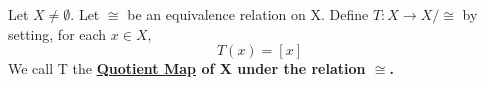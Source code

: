 \label{df:quotient_map}
\newcommand{\QuotientMap}[0]{
        \bf \hyperref[df:quotient_map]{Quotient Map} \rm
    }
    
 \newcommand{\QuotientMapInstance}[3]{
     #1 : #2\to #2/#3
}
\begin{df}

    Let $X \neq \emptyset$.
    Let $\cong$ be an equivalence relation on X.
    Define $T:X \to X/\cong$ by setting, for each $x \in X$, 
    \begin{equation}
        T(x)=[x]
    \end{equation}    
    We call T the \QuotientMap of X under the relation $\cong$. 
\end{df} 